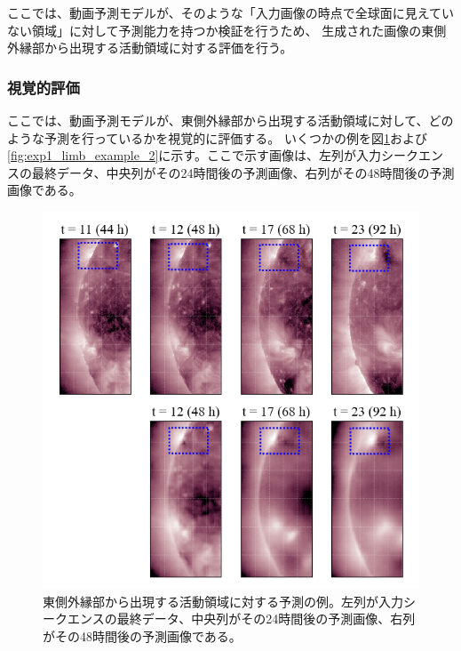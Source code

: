       ここでは、動画予測モデルが、そのような「入力画像の時点で全球面に見えていない領域」に対して予測能力を持つか検証を行うため、 生成された画像の東側外縁部から出現する活動領域に対する評価を行う。

      \subsubsection{視覚的評価}
        ここでは、動画予測モデルが、東側外縁部から出現する活動領域に対して、どのような予測を行っているかを視覚的に評価する。
        いくつかの例を図\ref{fig:exp1_limb_example_1}および\ref{fig:exp1_limb_example_2}に示す。ここで示す画像は、左列が入力シークエンスの最終データ、中央列がその24時間後の予測画像、右列がその48時間後の予測画像である。

        \begin{figure}[htbp]
          \centering
          \includegraphics[width=\textwidth]{figures/exp1/limb_sample_3_caption.jpg}
          \caption{東側外縁部から出現する活動領域に対する予測の例。左列が入力シークエンスの最終データ、中央列がその24時間後の予測画像、右列がその48時間後の予測画像である。}
          \label{fig:exp1_limb_example_1}
        \end{figure}
